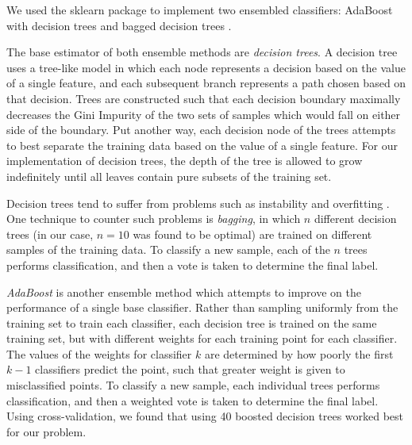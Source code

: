 \documentclass[conference]{IEEEtran}
\begin{document}
We used the sklearn package \cite{Pedregosa} to implement two ensembled classifiers: AdaBoost with decision trees \cite{Zhu} and bagged decision trees \cite{Breiman}. 

The base estimator of both ensemble methods are \textit{decision trees}. A decision tree uses a tree-like model in which each node represents a decision based on the value of a single feature, and each subsequent branch represents a path chosen based on that decision. Trees are constructed such that each decision boundary maximally decreases the Gini Impurity of the two sets of samples which would fall on either side of the boundary. Put another way, each decision node of the trees attempts to best separate the training data based on the value of a single feature. For our implementation of decision trees, the depth of the tree is allowed to grow indefinitely until all leaves contain pure subsets of the training set. 

Decision trees tend to suffer from problems such as instability and overfitting \cite{Gareth}. One technique to counter such problems is \textit{bagging}, in which $n$ different decision trees (in our case, $n = 10$ was found to be optimal) are trained on different samples of the training data. To classify a new sample, each of the $n$ trees performs classification, and then a vote is taken to determine the final label.

\textit{AdaBoost} is another ensemble method which attempts to improve on the performance of a single base classifier. Rather than sampling uniformly from the training set to train each classifier, each decision tree is trained on the same training set, but with different weights for each training point for each classifier. The values of the weights for classifier $k$ are determined by how poorly the first $k-1$ classifiers predict the point, such that greater weight is given to misclassified points. To classify a new sample, each individual trees performs classification, and then a weighted vote is taken to determine the final label. Using cross-validation, we found that using 40 boosted decision trees worked best for our problem.
\end{document}
